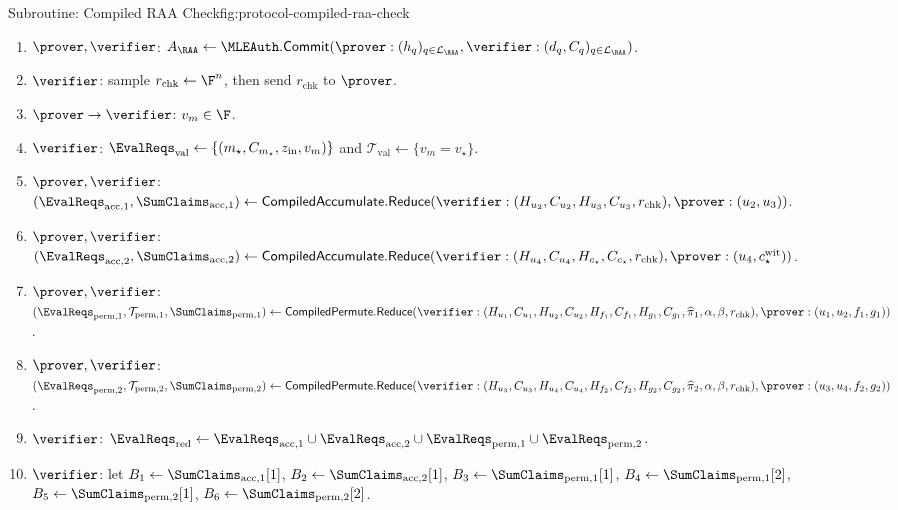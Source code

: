 \begin{protocolbox}{Subroutine: Compiled RAA Check}{fig:protocol-compiled-raa-check}
\begin{enumerate}[leftmargin=0.24in,label=\textbf{A\arabic*.},itemsep=0.06em,topsep=0.06em,parsep=0pt]
  \item \(\prover,\verifier\): \(A_{\RAA}\gets
        \MLEAuth.\mathsf{Commit}
        (\prover:(h_q)_{q\in\mathcal L_{\RAA}},
        \verifier:(d_q,C_q)_{q\in\mathcal L_{\RAA}})\).
  \item \(\verifier\): sample \(r_{\mathrm{chk}}\leftarrow\F^n\), then send
        \(r_{\mathrm{chk}}\) to \(\prover\).
  \item \(\prover\to\verifier\): \(v_m\in\F\).
  \item \(\verifier\): \(\EvalReqs_{\mathrm{val}}\gets
        \{(m_\star,C_{m_\star},z_{\mathrm{in}},v_m)\}\) and
        \(\mathcal T_{\mathrm{val}}\gets\{v_m=v_\star\}\).
  \item \(\prover,\verifier\):
        \((\EvalReqs_{\mathrm{acc},1},\SumClaims_{\mathrm{acc},1})\gets
        \mathsf{CompiledAccumulate.Reduce}
        (\verifier:(H_{u_2},C_{u_2},H_{u_3},C_{u_3},r_{\mathrm{chk}}),
        \prover:(u_2,u_3))\).
  \item \(\prover,\verifier\):
        \((\EvalReqs_{\mathrm{acc},2},\SumClaims_{\mathrm{acc},2})\gets
        \mathsf{CompiledAccumulate.Reduce}
        (\verifier:(H_{u_4},C_{u_4},H_{c_\star},C_{c_\star},r_{\mathrm{chk}}),
        \prover:(u_4,c_\star^{\mathrm{wit}}))\).
  \item \(\prover,\verifier\):
        \((\EvalReqs_{\mathrm{perm},1},\mathcal T_{\mathrm{perm},1},
        \SumClaims_{\mathrm{perm},1})\gets
        \mathsf{CompiledPermute.Reduce}
        (\verifier:(H_{u_1},C_{u_1},H_{u_2},C_{u_2},H_{f_1},C_{f_1},H_{g_1},C_{g_1},
        \widehat\pi_1,\alpha,\beta,r_{\mathrm{chk}}),
        \prover:(u_1,u_2,f_1,g_1))\).
  \item \(\prover,\verifier\):
        \((\EvalReqs_{\mathrm{perm},2},\mathcal T_{\mathrm{perm},2},
        \SumClaims_{\mathrm{perm},2})\gets
        \mathsf{CompiledPermute.Reduce}
        (\verifier:(H_{u_3},C_{u_3},H_{u_4},C_{u_4},H_{f_2},C_{f_2},H_{g_2},C_{g_2},
        \widehat\pi_2,\alpha,\beta,r_{\mathrm{chk}}),
        \prover:(u_3,u_4,f_2,g_2))\).
  \item \(\verifier\): \(\EvalReqs_{\mathrm{red}}\gets
        \EvalReqs_{\mathrm{acc},1}\cup\EvalReqs_{\mathrm{acc},2}\cup
        \EvalReqs_{\mathrm{perm},1}\cup\EvalReqs_{\mathrm{perm},2}\).
  \item \(\verifier\): let \(B_1\gets\SumClaims_{\mathrm{acc},1}[1]\), \(B_2\gets\SumClaims_{\mathrm{acc},2}[1]\), \(B_3\gets\SumClaims_{\mathrm{perm},1}[1]\), \(B_4\gets\SumClaims_{\mathrm{perm},1}[2]\), \(B_5\gets\SumClaims_{\mathrm{perm},2}[1]\), \(B_6\gets\SumClaims_{\mathrm{perm},2}[2]\).

\end{enumerate}
\end{protocolbox}
